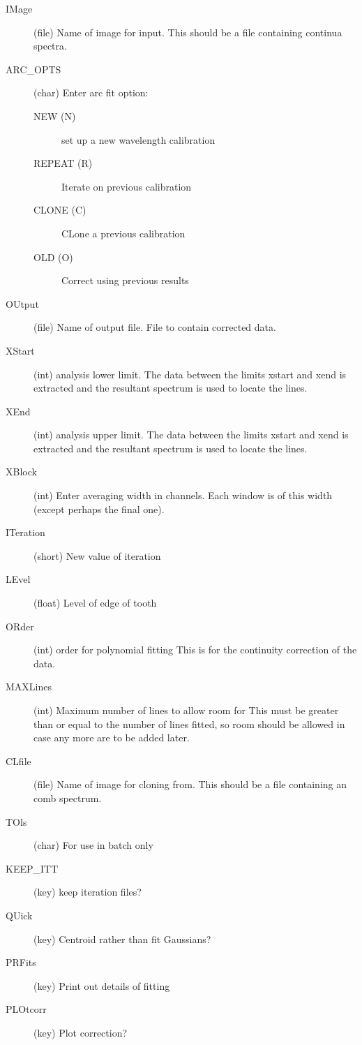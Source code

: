 \begin{description}
\item[IMage] (file) Name of image for input. This should be a file
containing continua spectra.
\item[ARC\_OPTS] (char) Enter arc fit option:
\begin{description}
\item[NEW (N)] set up a new wavelength calibration
\item[REPEAT (R)] Iterate on previous calibration
\item[CLONE (C)] CLone a previous calibration
\item[OLD (O)] Correct using previous results
\end{description}
\item[OUtput] (file) Name of output file. File to contain
corrected data.
\item[XStart] (int) analysis lower limit. The data between the
limits xstart and xend is extracted and the resultant spectrum is used
to locate the lines.
\item[XEnd] (int) analysis upper limit. The data between the
limits xstart and xend is extracted and the resultant spectrum is used
to locate the lines.
\item[XBlock] (int) Enter averaging width in channels. Each
window is of this width (except perhaps the final one).
\item[ITeration] (short) New value of iteration
\item[LEvel] (float) Level of edge of tooth
\item[ORder] (int) order for polynomial fitting This is for the
continuity correction of the data.
\item[MAXLines] (int) Maximum number of lines to allow room for
This must be greater than or equal to the number of lines fitted, so
room should be allowed in case any more are to be added later.
\item[CLfile] (file) Name of image for cloning from. This should
be a file containing an comb spectrum.
\item[TOls] (char) For use in batch only
\item[KEEP\_ITT] (key) keep iteration files?
\item[QUick] (key) Centroid rather than fit Gaussians?
\item[PRFits] (key) Print out details of fitting
\item[PLOtcorr] (key) Plot correction?
\end{description}

